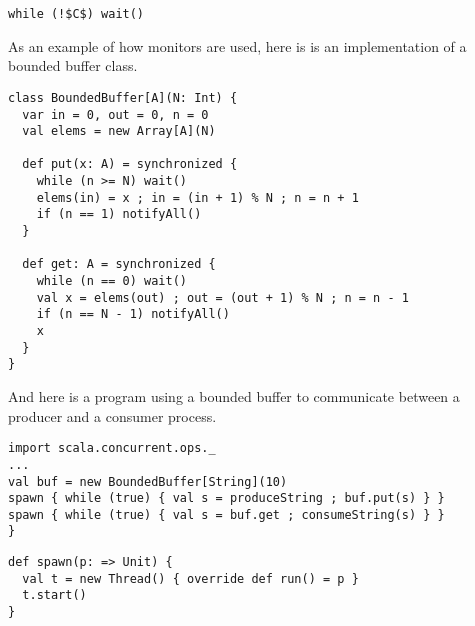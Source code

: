 

\begin{lstlisting}
while (!$C$) wait()
\end{lstlisting}

As an example of how monitors are used, here is is an implementation
of a bounded buffer class.
\begin{lstlisting}
class BoundedBuffer[A](N: Int) {
  var in = 0, out = 0, n = 0
  val elems = new Array[A](N)

  def put(x: A) = synchronized {
    while (n >= N) wait()
    elems(in) = x ; in = (in + 1) % N ; n = n + 1
    if (n == 1) notifyAll()
  }

  def get: A = synchronized {
    while (n == 0) wait()
    val x = elems(out) ; out = (out + 1) % N ; n = n - 1
    if (n == N - 1) notifyAll()
    x
  }
}
\end{lstlisting}
And here is a program using a bounded buffer to communicate between a
producer and a consumer process.
\begin{lstlisting}
import scala.concurrent.ops._
...
val buf = new BoundedBuffer[String](10)
spawn { while (true) { val s = produceString ; buf.put(s) } }
spawn { while (true) { val s = buf.get ; consumeString(s) } }
}
\end{lstlisting}
\begin{lstlisting}
def spawn(p: => Unit) {
  val t = new Thread() { override def run() = p }
  t.start()
}
\end{lstlisting}

